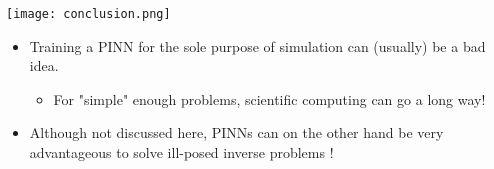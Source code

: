 \documentclass[aspectratio=169,compress,12pt,dvipsnames]{beamer}
\begin{document}
\begin{frame}
  \vfill
  \begin{minipage}{.28\textwidth}
    \centering
    \texttt{[image: conclusion.png]}
  \end{minipage}%
  \hfill
  \begin{minipage}{.68\textwidth}
    \begin{itemize}
      \item Training a PINN for the sole purpose of simulation can (usually) be a bad idea.
        \begin{itemize}
          \item For "simple" enough problems, scientific computing can go a long way!
        \end{itemize}
        \par
      \item Although not discussed here, PINNs can on the other hand be very advantageous to solve ill-posed inverse problems !
    \end{itemize}
  \end{minipage}
  \vfill
\end{frame}
\end{document}
